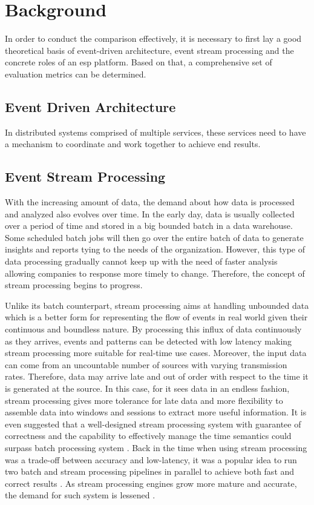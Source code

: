 \chapter{Background} \label{chap:background}
In order to conduct the comparison effectively, it is necessary to first lay a good theoretical basis of event-driven architecture, event stream processing and the concrete roles of an \acrlong{esp} platform. Based on that, a comprehensive set of evaluation metrics can be determined.
\section{Event Driven Architecture}
In distributed systems comprised of multiple services, these services need to have a mechanism to coordinate and work together to achieve end results. 
\section{Event Stream Processing} \label{section:eventstreamprocessing}
With the increasing amount of data, the demand about how data is processed and analyzed also evolves over time. In the early day, data is usually collected over a period of time and stored in a big bounded batch in a data warehouse. Some scheduled batch jobs will then go over the entire batch of data to generate insights and reports tying to the needs of the organization. However, this type of data processing gradually cannot keep up with the need of faster analysis allowing companies to response more timely to change. Therefore, the concept of stream processing begins to progress.


Unlike its batch counterpart, stream processing aims at handling unbounded data which is a better form for representing the flow of events in real world given their continuous and boundless nature. By processing this influx of data continuously as they arrives, events and patterns can be detected with low latency making stream processing more suitable for real-time use cases. Moreover, the input data can come from an uncountable number of sources with varying transmission rates. Therefore, data may arrive late and out of order with respect to the time it is generated at the source. In this case, for it sees data in an endless fashion, stream processing gives more tolerance for late data and more flexibility to assemble data into windows and sessions to extract more useful information. It is even suggested that a well-designed stream processing system with guarantee of correctness and the capability to effectively manage the time semantics could surpass batch processing system \cite{stream101}. Back in the time when using stream processing was a trade-off between accuracy and low-latency, it was a popular idea to run two batch and stream processing pipelines in parallel to achieve both fast and correct results \cite{lambdaarchitecture}.  As stream processing engines grow more mature and accurate, the demand for such system is lessened \cite{questionlambdaarchitecture}.

